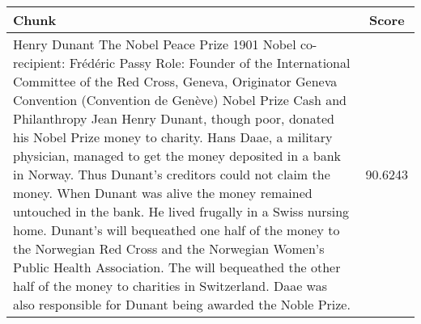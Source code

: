 \begin{table}[h!]
    \footnotesize
    \caption{Evaluation of text segmentation using a Small to Big technique (base chunk size 1024), text chunks derived from the entry "Henry Dunant award Nobel Peace Prize".}
    \begin{xltabular}{\linewidth}{X|c}
        \toprule
        \textbf{Chunk}                                                                                                                                                                                                                                                                                                                                                                                                                                                                                                                                                                                                                                                                                                                                                                                                                                                                                                                                                                                                                                                                                                                       & \textbf{Score} \\
        \midrule
        Henry Dunant The Nobel Peace Prize 1901 Nobel co-recipient: Frédéric Passy Role: Founder of the International Committee of the Red Cross, Geneva, Originator Geneva Convention (Convention de Genève) Nobel Prize Cash and Philanthropy Jean Henry Dunant, though poor, donated his Nobel Prize money to charity. Hans Daae, a military physician, managed to get the money deposited in a bank in Norway. Thus Dunant’s creditors could not claim the money. When Dunant was alive the money remained untouched in the bank. He lived frugally in a Swiss nursing home.  Dunant’s will bequeathed one half of the money to the Norwegian Red Cross and the Norwegian Women’s Public Health Association. The will bequeathed the other half of the money to charities in Switzerland.  Daae was also responsible for Dunant being awarded the Noble Prize. & 90.6243\\
        \bottomrule
    \end{xltabular}
    \label{tab:table-small2big}
\end{table}

